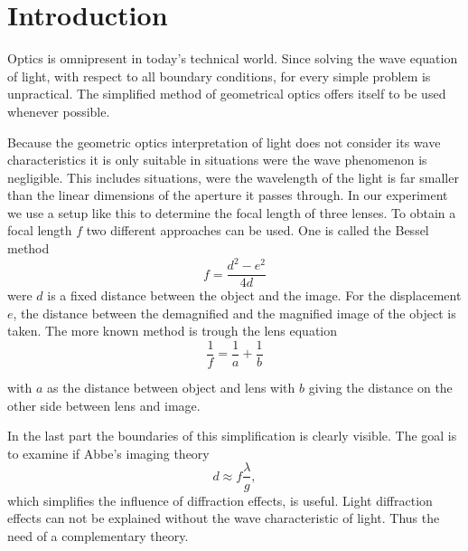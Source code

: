 \section{Introduction}
Optics is omnipresent in today's technical world.
Since solving the wave equation of light, with respect to all boundary conditions, for every simple problem is unpractical.
The simplified method of geometrical optics offers itself to be used whenever possible.

Because the geometric optics interpretation of light does not consider its wave characteristics it is only suitable in situations were the wave phenomenon is negligible.
This includes situations, were the wavelength of the light is far smaller than the linear dimensions of the aperture it passes through. 
In our experiment we use a setup like this to determine the focal length of three lenses. 
To obtain a focal length $f$ two different approaches can be used.
One is called the Bessel method\cite{manual}
\begin{equation}
f = \frac{d^2 - e^2}{4d}
\label{eq::bessel}
\end{equation}
were $d$ is a fixed distance between the object and the image.
For the displacement $e$, the distance between the demagnified and the magnified image of the object is taken.
The more known method is trough the lens equation\cite{manual} 
\begin{equation}
\frac{1}{f} = \frac{1}{a} + \frac{1}{b}
\label{eq::lens}
\end{equation}

with $a$ as the distance between object and lens with $b$ giving the distance on the other side between lens and image.

In the last part the boundaries of this simplification is clearly visible. 
The goal is to examine if Abbe's imaging theory\cite{manual}
\begin{equation}
d \approx f\frac{\lambda}{g},
\label{eq::diff}
\end{equation}
which simplifies the influence of diffraction effects, is useful. 
Light diffraction effects can not be explained without the wave characteristic of light.
Thus the need of a complementary theory.

